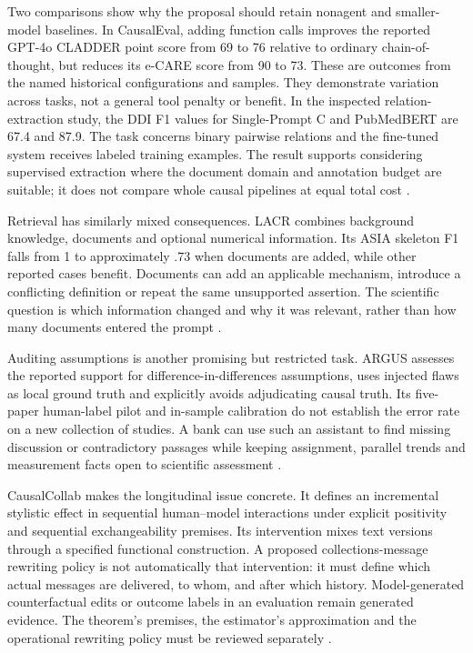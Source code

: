 Two comparisons show why the proposal should retain nonagent and smaller-model
baselines. In CausalEval, adding function calls improves the reported GPT-4o
CLADDER point score from 69 to 76 relative to ordinary chain-of-thought, but
reduces its e-CARE score from 90 to 73. These are outcomes from the named
historical configurations and samples. They demonstrate variation across tasks,
not a general tool penalty or benefit. In the inspected relation-extraction
study, the DDI F1 values for Single-Prompt C and PubMedBERT are 67.4 and 87.9.
The task concerns binary pairwise relations and the fine-tuned system receives
labeled training examples. The result supports considering supervised
extraction where the document domain and annotation budget are suitable; it
does not compare whole causal pipelines at equal total cost
\citep{exec13_census_causaleval,exec13_census_graph_validation}.

Retrieval has similarly mixed consequences. LACR combines background knowledge,
documents and optional numerical information. Its ASIA skeleton F1 falls from 1
to approximately .73 when documents are added, while other reported cases
benefit. Documents can add an applicable mechanism, introduce a conflicting
definition or repeat the same unsupported assertion. The scientific question
is which information changed and why it was relevant, rather than how many
documents entered the prompt \citep{v12_la_2402_15301}.

Auditing assumptions is another promising but restricted task. ARGUS assesses
the reported support for difference-in-differences assumptions, uses injected
flaws as local ground truth and explicitly avoids adjudicating causal truth.
Its five-paper human-label pilot and in-sample calibration do not establish
the error rate on a new collection of studies. A bank can use such an assistant
to find missing discussion or contradictory passages while keeping assignment,
parallel trends and measurement facts open to scientific assessment
\citep{v12_la_2609_30867}.

CausalCollab makes the longitudinal issue concrete. It defines an incremental
stylistic effect in sequential human--model interactions under explicit
positivity and sequential exchangeability premises. Its intervention mixes
text versions through a specified functional construction. A proposed
collections-message rewriting policy is not automatically that intervention:
it must define which actual messages are delivered, to whom, and after which
history. Model-generated counterfactual edits or outcome labels in an
evaluation remain generated evidence. The theorem's premises, the estimator's
approximation and the operational rewriting policy must be reviewed separately
\citep{exec13_census_collaboration}.

